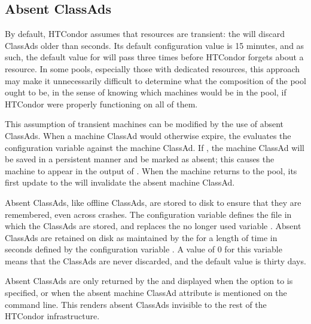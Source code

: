 \subsection{\label{sec:Absent-Ads}Absent ClassAds}

By default, HTCondor assumes that resources are transient: 
the 
will discard ClassAds older than  seconds.
Its default configuration value is 15 minutes, 
and as such, the default value for  will 
pass three times before HTCondor forgets about a resource.
In some pools, especially those with dedicated resources, 
this approach may make it unnecessarily difficult to determine 
what the composition of the pool ought to be, 
in the sense of knowing which machines would be in the pool,
if HTCondor were properly functioning on all of them.

This assumption of transient machines can be modified by 
the use of absent ClassAds.  
When a machine ClassAd would otherwise expire, 
the  evaluates the configuration variable
 against the machine ClassAd.
If , 
the machine ClassAd will be saved in a persistent manner and 
be marked as absent;
this causes the machine to appear in the output of 
.
When the machine returns to the pool, 
its first update to the  will 
invalidate the absent machine ClassAd.

Absent ClassAds, like offline ClassAds, 
are stored to disk to ensure that they are remembered,
even across  crashes.
The configuration variable 
defines the file in which the ClassAds are stored,
and replaces the no longer used variable .
Absent ClassAds are retained on disk as maintained by 
the  for a length of time in seconds defined by the
configuration variable .
A value of 0 for this variable means that the ClassAds are never discarded,
and the default value is thirty days.

Absent ClassAds are only returned by the  and displayed
when the  option to  is specified,
or when the absent machine ClassAd attribute is mentioned on 
the  command line.  
This renders absent ClassAds invisible to the rest of 
the HTCondor infrastructure.

